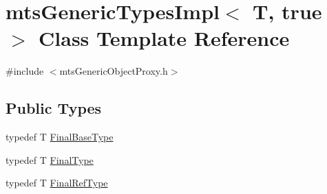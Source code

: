 \hypertarget{classmts_generic_types_impl_3_01_t_00_01true_01_4}{}\section{mts\+Generic\+Types\+Impl$<$ T, true $>$ Class Template Reference}
\label{classmts_generic_types_impl_3_01_t_00_01true_01_4}


{\ttfamily \#include $<$mts\+Generic\+Object\+Proxy.\+h$>$}

\subsection*{Public Types}
\begin{DoxyCompactItemize}
\item 
typedef T \hyperlink{classmts_generic_types_impl_3_01_t_00_01true_01_4_a3d735609254b24b78bc37157a3d9ce35}{Final\+Base\+Type}
\item 
typedef T \hyperlink{classmts_generic_types_impl_3_01_t_00_01true_01_4_a1ff3e9267a5ad6d54eaec1c50114bca2}{Final\+Type}
\item 
typedef T \hyperlink{classmts_generic_types_impl_3_01_t_00_01true_01_4_a76ded5912b20f9057bf7835ca04cfb89}{Final\+Ref\+Type}
\end{DoxyCompactItemize}
